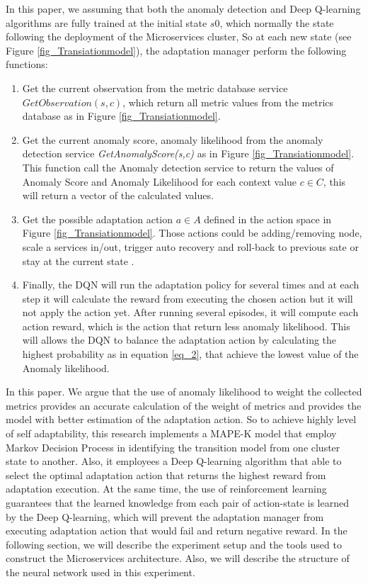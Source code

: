 \documentclass{ieeeaccess}
\begin{document}
In this paper, we assuming that both the anomaly detection  and Deep Q-learning algorithms are fully trained at the initial state $s0$, which normally the state following the deployment of the Microservices cluster, So at each new state (see Figure \ref{fig_Transiationmodel}), the adaptation manager perform the following functions: 
 \begin{enumerate}
 
 
 \item Get the current observation from the metric database service $GetObservation(s,c)$, which return all metric values from the metrics database as in Figure \ref{fig_Transiationmodel}.
 \item Get the current anomaly score, anomaly likelihood from the anomaly detection service \textit{GetAnomalyScore(s,c)} as in Figure \ref{fig_Transiationmodel}. This function call the Anomaly detection service to return the values of Anomaly Score and Anomaly Likelihood for each context value $c \in C$, this will return a vector of the calculated values.
	
 \item Get the possible adaptation action $a \in A$ defined in the action space in Figure \ref{fig_Transiationmodel}. Those actions could be adding/removing node, scale a services in/out, trigger auto recovery and roll-back to previous sate  or stay at the current state .  
 \item Finally, the DQN will run the adaptation policy for several times and at each step it will calculate the reward from executing the chosen action but it will not apply the action yet. After running several episodes, it will compute each action reward, which is the action that return less anomaly likelihood. This will allows the DQN to balance the adaptation action by calculating the highest probability as in equation \ref{eq_2}, that achieve the lowest value of the Anomaly likelihood. 
 \end{enumerate}
  
In this paper. We argue that the use of anomaly likelihood to weight the collected metrics provides an accurate calculation of the weight of metrics and provides the model with better estimation of the adaptation action. So to achieve highly level of self adaptability, this research implements a MAPE-K model that employ Markov Decision Process in identifying the transition model from one cluster state to another.  Also, it employees a Deep Q-learning algorithm that able to select the optimal adaptation action that returns the highest reward from adaptation execution. At the same time, the use of reinforcement learning guarantees that the learned knowledge from each pair of action-state is learned by the Deep Q-learning, which will prevent the adaptation manager from executing adaptation action that would fail and return negative reward. In the following section, we will describe the experiment setup and the tools used to construct the Microservices architecture. Also, we will describe the  structure of the neural network used in this experiment. 
\end{document}
